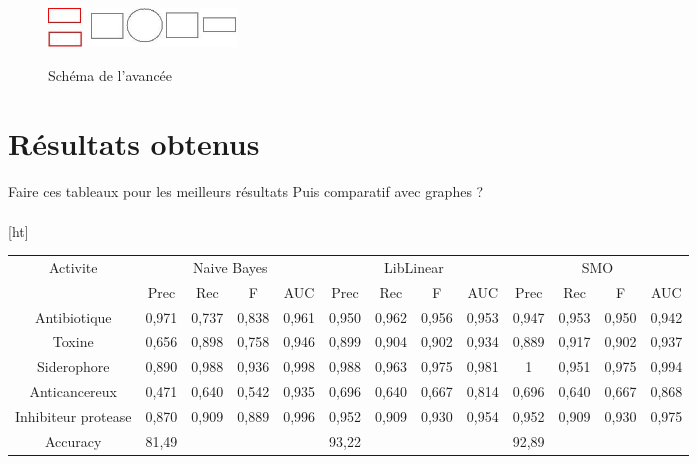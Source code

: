 \documentclass[a4paper,10pt]{report}
\begin{document}
      \begin{figure}[!h]
	    \begin{center}
	      \includegraphics[width=5cm]{image/step1.jpeg} \\
	      \caption{Schéma de l'avancée}
	    \end{center}
	 \end{figure}

	  
      \section{Résultats obtenus}
	 
	  
	  Faire ces tableaux pour les meilleurs résultats
	  Puis comparatif avec graphes ? 
	  \paragraph{} [ht]
	   \begin{flushleft}
	    \leftskip -3cm
	    \begin{tabular}{|c||c|c|c|c||c|c|c|c||c|c|c|c|}\hline
	      {Activite} & \multicolumn{4}{c||}{Naive Bayes} & \multicolumn{4}{c||}{LibLinear} & \multicolumn{4}{c|}{SMO} \\\cline{2-13}
	       & Prec & Rec & F & AUC & Prec & Rec & F & AUC & Prec & Rec & F & AUC \\\hline
	      Antibiotique & 0,971 & 0,737 & 0,838 & 0,961 & 0,950 & 0,962 & 0,956 & 0,953 & 0,947 & 0,953 & 0,950 & 0,942 \\\hline
	      Toxine & 0,656 & 0,898 & 0,758 & 0,946 & 0,899 & 0,904 & 0,902 & 0,934 & 0,889 & 0,917 & 0,902 & 0,937  \\\hline
	      Siderophore & 0,890 & 0,988 & 0,936 & 0,998 & 0,988 & 0,963 & 0,975 & 0,981 & 1 & 0,951 & 0,975 & 0,994  \\\hline
	      Anticancereux & 0,471 & 0,640 & 0,542 & 0,935 & 0,696 & 0,640 & 0,667 & 0,814 & 0,696 & 0,640 & 0,667 & 0,868 \\\hline
	      Inhibiteur protease & 0,870 & 0,909 & 0,889 & 0,996 & 0,952 & 0,909 & 0,930 & 0,954 & 0,952 & 0,909 & 0,930 & 0,975 \\\hline
	      Accuracy & \multicolumn{4}{l||}{81,49} & \multicolumn{4}{l||}{93,22} & \multicolumn{4}{l|}{92,89} \\\hline
	    \end{tabular}
	     \label{tableau 1}
	  \end{flushleft}
	  
\end{document}
